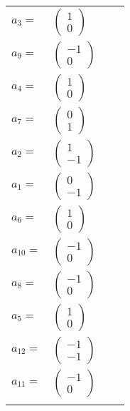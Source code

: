 \documentclass[1p]{elsarticle_modified}
\theoremstyle{definition}
\begin{document}
\begin{tabular}{m{7pt} m{180pt} m{7pt} m{180pt} }
\flushright $a_{3}=$&$\begin{pmatrix}1\\0\end{pmatrix}$ \\
\flushright $a_{9}=$&$\begin{pmatrix}-1\\0\end{pmatrix}$ \\
\flushright $a_{4}=$&$\begin{pmatrix}1\\0\end{pmatrix}$ \\
\flushright $a_{7}=$&$\begin{pmatrix}0\\1\end{pmatrix}$ \\
\flushright $a_{2}=$&$\begin{pmatrix}1\\-1\end{pmatrix}$ \\
\flushright $a_{1}=$&$\begin{pmatrix}0\\-1\end{pmatrix}$ \\
\flushright $a_{6}=$&$\begin{pmatrix}1\\0\end{pmatrix}$ \\
\flushright $a_{10}=$&$\begin{pmatrix}-1\\0\end{pmatrix}$ \\
\flushright $a_{8}=$&$\begin{pmatrix}-1\\0\end{pmatrix}$ \\
\flushright $a_{5}=$&$\begin{pmatrix}1\\0\end{pmatrix}$ \\
\flushright $a_{12}=$&$\begin{pmatrix}-1\\-1\end{pmatrix}$ \\
\flushright $a_{11}=$&$\begin{pmatrix}-1\\0\end{pmatrix}$\\&\end{tabular}
\end{document}
